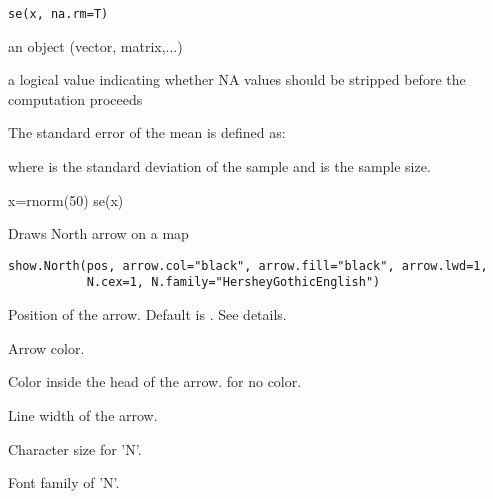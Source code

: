 \documentclass[a4paper]{book}
\begin{document}
\newpage
{}
%
\begin{Usage}
\begin{verbatim}
se(x, na.rm=T)
\end{verbatim}
\end{Usage}
%
\begin{Arguments}
\begin{ldescription}
\item[\code{x}] an \R{} object (vector, matrix,...)

\item[\code{na.rm}] a logical value indicating whether NA values should be stripped before the computation proceeds

\end{ldescription}
\end{Arguments}
%
\begin{Details}\relax
The standard error of the mean is defined as:


where  is the standard deviation of the sample and  is the sample size.

\end{Details}
%
\begin{Examples}
\begin{ExampleCode}
x=rnorm(50)
se(x)
\end{ExampleCode}
\end{Examples}
\newpage
{}
%
\begin{Description}\relax
Draws North arrow on a map
\end{Description}
%
\begin{Usage}
\begin{verbatim}
show.North(pos, arrow.col="black", arrow.fill="black", arrow.lwd=1,
           N.cex=1, N.family="HersheyGothicEnglish")
\end{verbatim}
\end{Usage}
%
\begin{Arguments}
\begin{ldescription}
\item[\code{pos}] Position of the arrow. Default is . See details.

\item[\code{arrow.col}] Arrow color.

\item[\code{arrow.fill}] Color inside the head of the arrow.  for no color.

\item[\code{arrow.lwd}] Line width of the arrow.

\item[\code{N.cex}] Character size for 'N'.

\item[\code{N.family}] Font family of 'N'.


\end{ldescription}
\end{Arguments}
\end{document}
